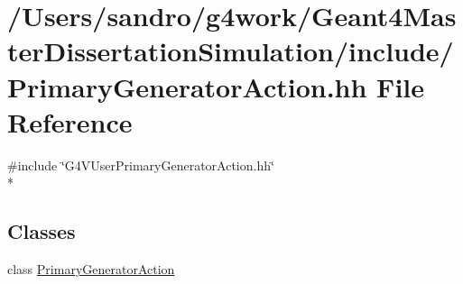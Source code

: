 \hypertarget{_primary_generator_action_8hh}{\section{/\-Users/sandro/g4work/\-Geant4\-Master\-Dissertation\-Simulation/include/\-Primary\-Generator\-Action.hh File Reference}
\label{_primary_generator_action_8hh}
}
{\ttfamily \#include \char`\"{}G4\-V\-User\-Primary\-Generator\-Action.\-hh\char`\"{}}\\*
\subsection*{Classes}
\begin{DoxyCompactItemize}
\item 
class \hyperlink{class_primary_generator_action}{Primary\-Generator\-Action}
\end{DoxyCompactItemize}
